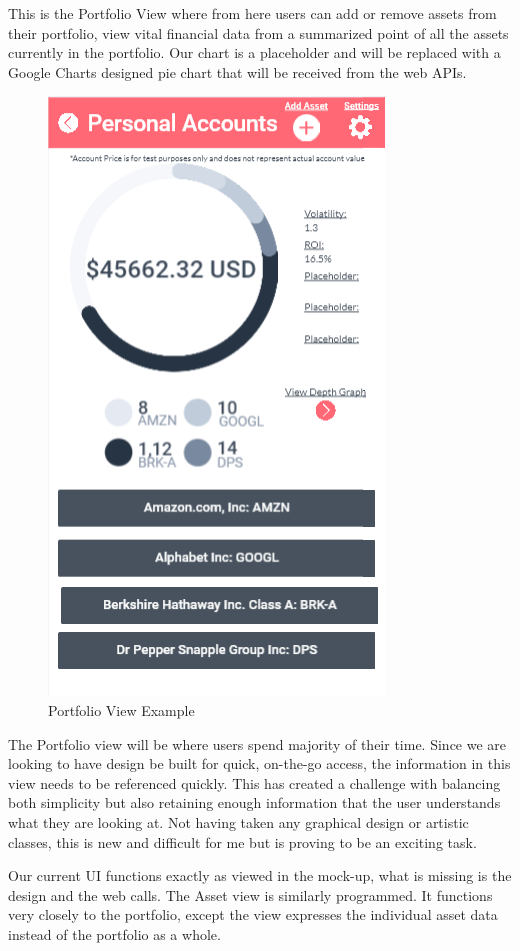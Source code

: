 \documentclass[letterpaper,10pt,titlepage,journal,compsoc,draftclsnofoot,onecolumn]{IEEEtran}
\begin{document}
This is the Portfolio View where from here users can add or remove assets from their portfolio, view vital financial data from a summarized point of all the assets currently in the portfolio. Our chart is a placeholder and will be replaced with a Google Charts designed pie chart that will be received from the web APIs.  
\begin{figure}[h]
   \caption{Portfolio View Example}
   \includegraphics[scale=.5]{portfolio_screenshot}
\end{figure}
The Portfolio view will be where users spend majority of their time. Since we are looking to have design be built for quick, on-the-go access, the information in this view needs to be referenced quickly. This has created a challenge with balancing both simplicity but also retaining enough information that the user understands what they are looking at. Not having taken any graphical design or artistic classes, this is new and difficult for me but is proving to be an exciting task.

Our current UI functions exactly as viewed in the mock-up, what is missing is the design and the web calls. The Asset view is similarly programmed. It functions very closely to the portfolio, except the view expresses the individual asset data instead of the portfolio as a whole.
\end{document}
